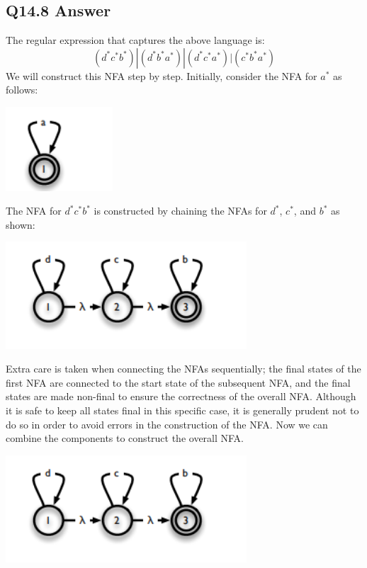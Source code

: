 \documentclass{article}
\begin{document}
\subsection*{Q14.8 Answer}
The regular expression that captures the above language is:
\[(d^*c^*b^*)|(d^*b^*a^*)|(d^*c^*a^*)|(c^*b^*a^*)\]
We will construct this NFA step by step. Initially, consider the NFA for \( a^* \) as follows:
\begin{center}
    \includegraphics[width=4cm]{10.png}
\end{center}
The NFA for \( d^*c^*b^* \) is constructed by chaining the NFAs for \( d^* \), \( c^* \), and \( b^* \) as shown:
\begin{center}
    \includegraphics[width=9cm]{11.png}
\end{center}
Extra care is taken when connecting the NFAs sequentially; the final states of the first NFA are connected to the start state of the subsequent NFA, and the final states are made non-final to ensure the correctness of the overall NFA. Although it is safe to keep all states final in this specific case, it is generally prudent not to do so in order to avoid errors in the construction of the NFA.
Now we can combine the components to construct the overall NFA.
\begin{center}
    \includegraphics[width=9cm]{11.png}
\end{center}
\newpage
{}
\end{document}
